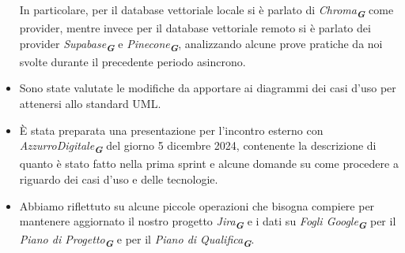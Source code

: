 \begin{itemize}
\begin{itemize}
\begin{itemize}
        \end{itemize}
    \end{itemize}
    In particolare, per il database vettoriale locale si è parlato di \emph{Chroma}\textsubscript{\textit{\textbf{G}}} come provider, mentre invece per il database
    vettoriale remoto si è parlato dei provider \emph{Supabase}\textsubscript{\textit{\textbf{G}}} e \emph{Pinecone}\textsubscript{\textit{\textbf{G}}},
    analizzando alcune prove pratiche da noi svolte durante il precedente periodo asincrono.
    \item  Sono state valutate le modifiche da apportare ai diagrammi dei casi d'uso per attenersi allo standard UML.
    \item È stata preparata una presentazione per l'incontro esterno con \emph{AzzurroDigitale}\textsubscript{\textit{\textbf{G}}} del giorno 5 dicembre 2024,
    contenente la descrizione di quanto è stato fatto nella prima sprint e alcune domande su come procedere a riguardo dei casi d'uso e delle tecnologie.
    \item Abbiamo riflettuto su alcune piccole operazioni che bisogna compiere per mantenere aggiornato il nostro progetto \emph{Jira}\textsubscript{\textit{\textbf{G}}}
    e i dati su \emph{Fogli Google}\textsubscript{\textit{\textbf{G}}} per il \emph{Piano di Progetto}\textsubscript{\textit{\textbf{G}}} e per il 
    \emph{Piano di Qualifica}\textsubscript{\textit{\textbf{G}}}.
\end{itemize}
